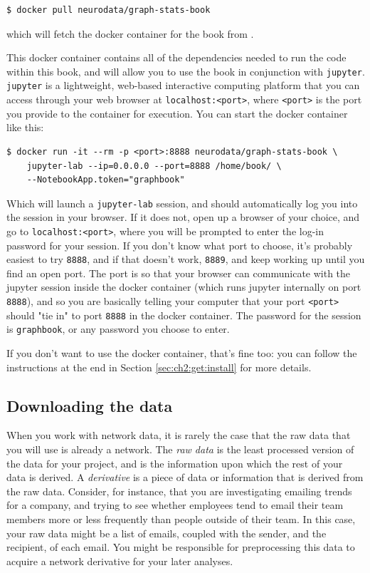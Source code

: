 \begin{lstlisting}[style=bash]
$ docker pull neurodata/graph-stats-book
\end{lstlisting}

which will fetch the docker container for the book from \cite{thisbookdocker}.

This docker container contains all of the dependencies needed to run the code within this book, and will allow you to use the book in conjunction with \texttt{jupyter}. \texttt{jupyter} is a lightweight, web-based interactive computing platform that you can access through your web browser at \texttt{localhost:<port>}, where \texttt{<port>} is the port you provide to the container for execution. You can start the docker container like this:

\begin{lstlisting}[style=bash]
$ docker run -it --rm -p <port>:8888 neurodata/graph-stats-book \
    jupyter-lab --ip=0.0.0.0 --port=8888 /home/book/ \
    --NotebookApp.token="graphbook"
\end{lstlisting}

Which will launch a \texttt{jupyter-lab} session, and {should} automatically log you into the session in your browser. If it does not, open up a browser of your choice, and go to \texttt{localhost:<port>}, where you will be prompted to enter the log-in password for your session. If you don't know what port to choose, it's probably easiest to try \texttt{8888}, and if that doesn't work, \texttt{8889}, and keep working up until you find an open port. The port is so that your browser can communicate with the jupyter session inside the docker container (which runs jupyter internally on port \texttt{8888}), and so you are basically telling your computer that your port \texttt{<port>} should "tie in" to port \texttt{8888} in the docker container. The password for the session is \texttt{graphbook}, or any password you choose to enter.

If you don't want to use the docker container, that's fine too: you can follow the instructions at the end in Section \ref{sec:ch2:get:install} for more details. 

\subsection{Downloading the data}

When you work with network data, it is rarely the case that the {raw data} that you will use is already a network. The \textit{raw data} is the least processed version of the data for your project, and is the information upon which the rest of your data is {derived}. A \textit{derivative} is a piece of data or information that is {derived} from the raw data. Consider, for instance, that you are investigating emailing trends for a company, and trying to see whether employees tend to email their team members more or less frequently than people outside of their team. In this case, your raw data might be a list of emails, coupled with the sender, and the recipient, of each email. You might be responsible for {preprocessing} this data to acquire a network derivative for your later analyses.

